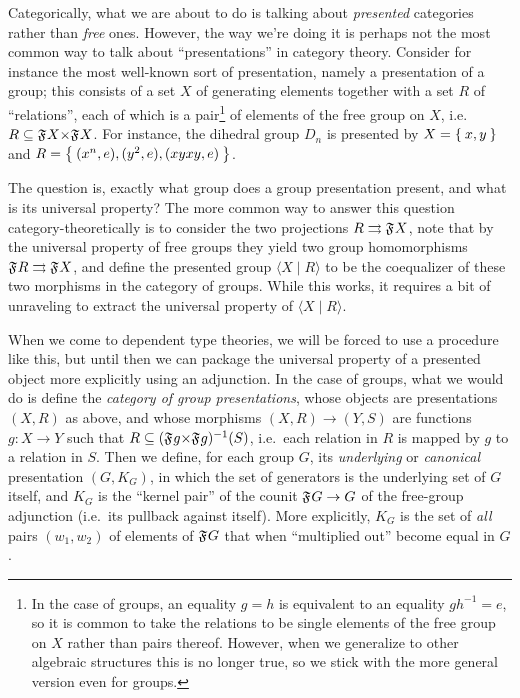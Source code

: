 Categorically, what we are about to do is talking about \emph{presented} categories rather than \emph{free} ones.
However, the way we're doing it is perhaps not the most common way to talk about ``presentations'' in category theory.
Consider for instance the most well-known sort of presentation, namely a presentation of a group; this consists of a set $X$ of generating elements together with a set $R$ of ``relations'', each of which is a pair\footnote{In the case of groups, an equality $g = h$ is equivalent to an equality $g h^{-1} = e$, so it is common to take the relations to be single elements of the free group on $X$ rather than pairs thereof.
  However, when we generalize to other algebraic structures this is no longer true, so we stick with the more general version even for groups.} of elements of the free group on $X$, i.e.\ $R\subseteq \F{}X\times \F{}X$.
For instance, the dihedral group $D_n$ is presented by $X = \Set{x,y}$ and $R = \Set{(x^n,e), (y^2,e), (xyxy,e)}$.

The question is, exactly what group does a group presentation present, and what is its universal property?
The more common way to answer this question category-theoretically is to consider the two projections $R \rightrightarrows \mathfrak{F}_{}X$, note that by the universal property of free groups they yield two group homomorphisms $\mathfrak{F}_{}R \rightrightarrows \mathfrak{F}_{}X$, and define the presented group $\langle X\mid R\rangle$ to be the coequalizer of these two morphisms in the category of groups.
While this works, it requires a bit of unraveling to extract the universal property of $\langle X\mid R\rangle$.

When we come to dependent type theories, we will be forced to use a procedure like this, but until then we can package the universal property of a presented object more explicitly using an adjunction.
In the case of groups, what we would do is define the \emph{category of group presentations}, whose objects are presentations $(X,R)$ as above, and whose morphisms $(X,R) \to (Y,S)$ are functions $g:X\to Y$ such that $R \subseteq (\F{}g \times \F{}g)^{-1}(S)$, i.e.\ each relation in $R$ is mapped by $g$ to a relation in $S$.
Then we define, for each group $G$, its \emph{underlying} or \emph{canonical} presentation $(G,K_G)$, in which the set of generators is the underlying set of $G$ itself, and $K_G$ is the ``kernel pair'' of the counit $\mathfrak{F}_{}G\to G$ of the free-group adjunction (i.e.\ its pullback against itself).
More explicitly, $K_G$ is the set of \emph{all} pairs $(w_1,w_2)$ of elements of $\mathfrak{F}_{}G$ that when ``multiplied out'' become equal in $G$.

